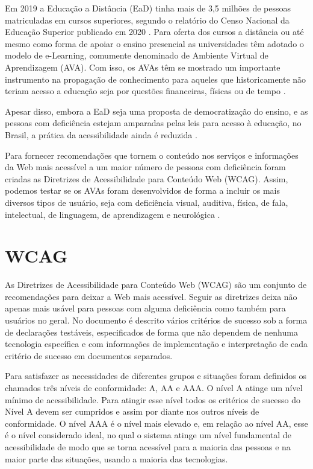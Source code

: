 \documentclass[
	12pt,				%
	openright,			%
	oneside,			%
	a4paper,			%
	chapter=TITLE,		%
	section=TITLE,		%
	subsection=TITLE,	%
	subsubsection=TITLE,%
	english,			%
	brazil				%
	]{abntex2}
\theoremstyle{definition}
\begin{document}
Em 2019 a Educação a Distância (EaD) tinha mais de 3,5 milhões de pessoas matriculadas em cursos superiores, segundo o relatório do Censo Nacional da Educação Superior publicado em 2020 \cite{da2019notas}. Para oferta dos cursos a distância ou até mesmo como forma de apoiar o ensino presencial as universidades têm adotado o modelo de e-Learning, comumente denominado de Ambiente Virtual de Aprendizagem (AVA). Com isso, os AVAs têm se mostrado um importante instrumento na propagação de conhecimento para aqueles que historicamente não teriam acesso a educação seja por questões financeiras, físicas ou de tempo \cite{sharma2014quantitative}.

Apesar disso, embora a EaD seja uma proposta de democratização do ensino, e as pessoas com deficiência estejam amparadas pelas leis para acesso à educação, no Brasil, a prática da acessibilidade ainda é reduzida \cite{dos2021acessibilidade}.


Para fornecer recomendações que tornem o conteúdo nos serviços e informações da Web mais acessível a um maior número de pessoas com deficiência foram criadas as Diretrizes de Acessibilidade para Conteúdo Web (WCAG). Assim, podemos testar se os AVAs foram desenvolvidos de forma a incluir os mais diversos tipos de usuário, seja com deficiência visual, auditiva, física, de fala, intelectual, de linguagem, de aprendizagem e neurológica \cite{caldwell2008web}.

\section{WCAG}
 
As Diretrizes de Acessibilidade para Conteúdo Web (WCAG) são um conjunto de recomendações para deixar a Web mais acessível. Seguir as diretrizes deixa não apenas mais usável para pessoas com alguma deficiência como também para usuários no geral. No documento é descrito vários critérios de sucesso sob a forma de declarações testáveis, especificados de forma que não dependem de nenhuma tecnologia específica e com informações de implementação e interpretação de cada critério de sucesso em documentos separados.

Para satisfazer as necessidades de diferentes grupos e situações foram definidos os chamados três níveis de conformidade: A, AA e AAA. O nível A atinge um nível mínimo de acessibilidade. Para atingir esse nível todos os critérios de sucesso do Nível A devem ser cumpridos e assim por diante nos outros níveis de conformidade. O nível AAA é o nível mais elevado e, em relação ao nível AA, esse é o nível considerado ideal, no qual o sistema atinge um nível fundamental de acessibilidade de modo que se torna acessível para a maioria das pessoas e na maior parte das situações, usando a maioria das tecnologias.
\end{document}

